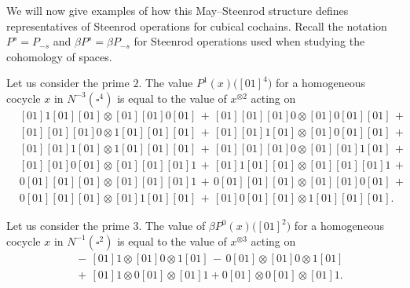 We will now give examples of how this May--Steenrod structure defines representatives of Steenrod operations for cubical cochains.
Recall the notation $P^s = P_{-s}$ and $\beta P^s = \beta P_{-s}$ for Steenrod operations used when studying the cohomology of spaces.

\begin{example}
	Let us consider the prime $2$.
	The value $P^1(x)\big([01]^{4}\big)$ for a homogeneous cocycle $x$ in $N^{-3}(\square^4)$ is equal to the value of $x^{\otimes 2}$ acting on
	\begin{align*}&
	[01]1[01][01] \otimes [01][01]0[01]\,+\,
	[01][01][01]0 \otimes [01]0[01][01]\,+\, \\&
	[01][01][01]0 \otimes 1[01][01][01]\,+\,
	[01][01]1[01] \otimes [01]0[01][01]\,+\, \\&
	[01][01]1[01] \otimes 1[01][01][01]\,+\,
	[01][01][01]0 \otimes [01][01]1[01]\,+\, \\&
	[01][01]0[01] \otimes [01][01][01]1\,+\,
	[01]1[01][01] \otimes [01][01][01]1\,+\, \\&
	0[01][01][01] \otimes [01][01][01]1\,+\,
	0[01][01][01] \otimes [01][01]0[01]\,+\, \\&
	0[01][01][01] \otimes [01]1[01][01]\,+\,
	[01]0[01][01] \otimes 1[01][01][01].\,\phantom{+}\,
	\end{align*}
\end{example}

\begin{example}
	Let us consider the prime $3$.
	The value of $\beta P^0(x)\big([01]^2\big)$ for a homogeneous cocycle $x$ in $N^{-1}(\square^2)$ is equal to the value of $x^{\otimes 3}$ acting on
	\begin{align*}
	&\,-\, [01]1 \otimes [01]0 \otimes 1[01] \,-\, 0[01] \otimes [01]0 \otimes 1[01] \\
	&\,+\, [01]1 \otimes 0[01] \otimes [01]1 + 0[01] \otimes 0[01] \otimes [01]1.
	\end{align*}
\end{example}
